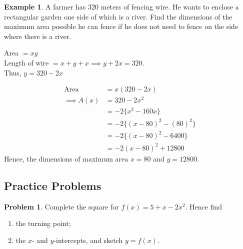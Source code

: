 \documentclass[11pt,a4paper]{article}
\theoremstyle{definition}
\newtheorem{example}[thm]{Example}
\newtheorem{problemx}{Problem}[section]
\newenvironment{problem}{\begin{problemx}}{\end{problemx}}
\begin{document}
\begin{example}

A farmer has 320 meters of fencing wire. He wants to enclose a rectangular garden one side of which is a river. Find the dimensions of the maximum area possible he can fence if he does not need to fence on the side where there is a river.


\begin{figure}[H]
\centering
{}
\end{figure}


Area $=xy$\\

Length of wire $=x+y+x\implies y+2x=320$.\\

Thus, $y=320-2x$

\begin{align*}
\text{Area} & = x(320-2x)\\
\implies A(x) & = 320-2x^2\\
              & = -2\{x^2-160x\}\\
              & = -2\{(x-80)^2-(80)^2\}\\
              & = -2\{(x-80)^2-6400\}\\
              & = -2(x-80)^2+12800
\end{align*}
Hence, the dimensions of maximum area $x=80$ and $y=12800$.
\end{example}
\pagebreak

\subsection{Practice Problems}

\begin{problem}
Complete the square for $f(x)=5+x-2x^{2}$. Hence find
\begin{enumerate}
\item[(a).] the turning point;
\item[(b).] the $x$- and $y$-intercepts, and sketch $y=f(x)$.
\end{enumerate}
\end{problem}
\end{document}
